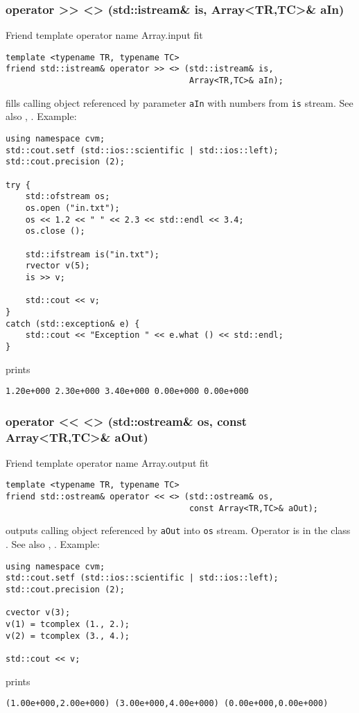 \subsubsection{operator >{}> <> (std::istream\& is, Array<TR,TC>\& aIn)}
Friend template operator%
\pdfdest name {Array.input} fit
\begin{verbatim}
template <typename TR, typename TC>
friend std::istream& operator >> <> (std::istream& is,
                                     Array<TR,TC>& aIn);
\end{verbatim}
fills calling object referenced by parameter \verb"aIn" with numbers from
\verb"is" stream.
See also ,
.
Example:
\begin{Verbatim}
using namespace cvm;
std::cout.setf (std::ios::scientific | std::ios::left);
std::cout.precision (2);

try {
    std::ofstream os;
    os.open ("in.txt");
    os << 1.2 << " " << 2.3 << std::endl << 3.4;
    os.close ();

    std::ifstream is("in.txt");
    rvector v(5);
    is >> v;

    std::cout << v;
}
catch (std::exception& e) {
    std::cout << "Exception " << e.what () << std::endl;
}
\end{Verbatim}
prints
\begin{Verbatim}
1.20e+000 2.30e+000 3.40e+000 0.00e+000 0.00e+000
\end{Verbatim}
\newpage


\subsubsection{operator <{}< <> (std::ostream\& os, const Array<TR,TC>\& aOut)}
Friend template operator%
\pdfdest name {Array.output} fit
\begin{verbatim}
template <typename TR, typename TC>
friend std::ostream& operator << <> (std::ostream& os,
                                     const Array<TR,TC>& aOut);
\end{verbatim}
outputs calling object referenced by \verb"aOut" into
\verb"os" stream.
Operator is 
in the class
.
See also ,
.
Example:
\begin{Verbatim}
using namespace cvm;
std::cout.setf (std::ios::scientific | std::ios::left);
std::cout.precision (2);

cvector v(3);
v(1) = tcomplex (1., 2.);
v(2) = tcomplex (3., 4.);

std::cout << v;
\end{Verbatim}
prints
\begin{Verbatim}
(1.00e+000,2.00e+000) (3.00e+000,4.00e+000) (0.00e+000,0.00e+000)
\end{Verbatim}
\newpage

